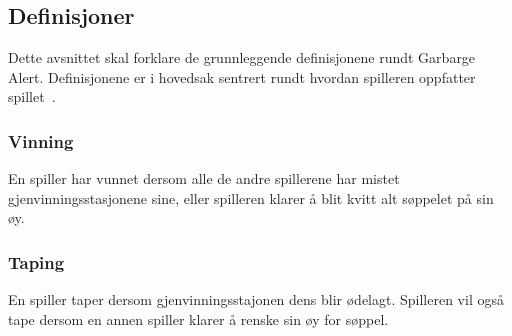 \subsection{Definisjoner}
Dette avsnittet skal forklare de grunnleggende definisjonene rundt
Garbarge Alert. Definisjonene er i hovedsak sentrert rundt hvordan
spilleren oppfatter spillet~\cite{gameplay}.
\subsubsection{Vinning}
En spiller har vunnet dersom alle de andre spillerene har mistet
gjenvinningsstasjonene sine, eller spilleren klarer å blit kvitt alt
søppelet på sin øy.
\subsubsection{Taping}
En spiller taper dersom gjenvinningsstajonen dens blir ødelagt. Spilleren
vil også tape dersom en annen spiller klarer å renske sin øy for søppel.
